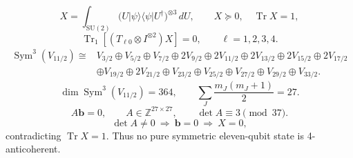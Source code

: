 \[
X=\int_{\mathrm{SU}(2)}\bigl(U|\psi\rangle\langle\psi|U^\dagger\bigr)^{\otimes3}\,dU,
\qquad X\succeq0,\quad\operatorname{Tr}X=1,
\]
\[
\operatorname{Tr}_{1}[(T_{\ell0}\otimes I^{\otimes2})X]=0,
\qquad \ell=1,2,3,4.
\]
\[
\begin{aligned}
\operatorname{Sym}^{3}(V_{11/2})\cong{}&
V_{3/2}\oplus V_{5/2}\oplus V_{7/2}\oplus2V_{9/2}\oplus2V_{11/2}
\oplus2V_{13/2}\oplus2V_{15/2}\oplus2V_{17/2}\\
&\oplus V_{19/2}\oplus2V_{21/2}\oplus V_{23/2}\oplus V_{25/2}
\oplus V_{27/2}\oplus V_{29/2}\oplus V_{33/2}.
\end{aligned}
\]
\[
\dim\operatorname{Sym}^{3}(V_{11/2})=364,
\qquad\sum_J\frac{m_J(m_J+1)}2=27.
\]
\[
A\mathbf b=0,\qquad A\in\mathbb Z^{27\times27},
\qquad\det A\equiv3\pmod{37}.
\]
\[
\det A\ne0\ \Longrightarrow\ \mathbf b=0\ \Longrightarrow\ X=0,
\]
contradicting \(\operatorname{Tr}X=1\). Thus no pure symmetric eleven-qubit state is 4-anticoherent.
